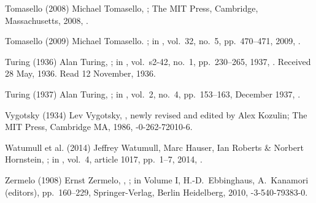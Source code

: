 \biblabel Tomasello (2008)
Michael Tomasello,
;
The MIT Press, Cambridge, Massachusetts, 2008,
.

\biblabel Tomasello (2009)
Michael Tomasello.
;
in ,
vol.\ 32, no.\ 5, pp.\ 470--471, 2009,
.

\biblabel Turing (1936)
Alan Turing,
;
in ,
vol.\ s2-42, no.\ 1, pp.\ 230--265, 1937,
.
Received 28 May, 1936. Read 12 November, 1936.

\biblabel Turing (1937)
Alan Turing,
; in
,
vol.\ 2, no.\ 4, pp.\ 153--163, December 1937,
.

\biblabel Vygotsky (1934)
Lev Vygotsky,
,
newly revised and edited by Alex Kozulin;
The MIT Press, Cambridge MA, 1986,
-0-262-72010-6.

\biblabel Watumull et al. (2014)
Jeffrey Watumull, Marc Hauser, Ian Roberts \& Norbert Hornstein,
; in
,
vol.\ 4, article 1017, pp.\ 1--7, 2014,
.

\biblabel Zermelo (1908)
Ernst Zermelo,
,
;
in  Volume I,
H.-D.\ Ebbinghaus, A.\ Kanamori (editors),
pp.\ 160--229,
Springer-Verlag, Berlin Heidelberg, 2010,
-3-540-79383-0.

\endinput
